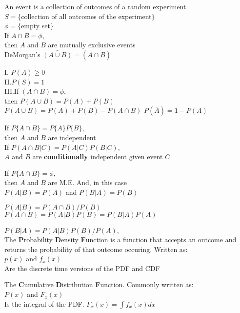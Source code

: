 An event is a collection of outcomes of a random experiment \\
$S=\{$collection of all outcomes of the experiment$\}$ \\
$\phi = \{$empty set$\}$ \\
If $A\cap B=\phi$, \\ then $A$ and $B$ are mutually exclusive events\\
DeMorgan's $\bar{(A\cup B)} = (\bar{A}\cap \bar{B})$

I. $P(A)\geq 0$\\
II.\@ $P(S) = 1$ \\
III.\@ If $(A\cap B) = \phi$, \\then $P(A\cup B) = P(A) + P(B)$
$P(A\cup B)=P(A) + P(B) -P(A\cap B)$
$P(\bar{A})=1-P(A)$


If $P\{A\cap B\} = P\{A\}P\{B\}$, \\then $A$ and $B$ are independent \\
If $P(A\cap B|C)=P(A|C)P(B|C)$, \\
$A$ and $B$ are {\bf conditionally} independent given event $C$ 

If $P\{A\cap B\} = \phi$, \\then $A$ and $B$ are M.E. 
And, in this case \\
$P(A|B)=P(A)$ and $P(B|A)=P(B)$


$P(A|B)=P(A\cap B)/P(B)$
$P(A\cap B) = P(A|B)P(B) = P(B|A)P(A)$

$P(B|A)=P(A|B)P(B)/P(A)$, \\

%

The {\bfseries P}robability {\bfseries D}ensity {\bfseries F}unction is a function that accepts an outcome and 
returns the probability of that outcome occuring. Written as: \\
$p(x)$ and $f_x(x)$\\
Are the discrete time versions of the PDF and CDF

The {\bfseries C}umulative {\bfseries D}istribution {\bfseries F}unction.
Commonly written as: \\
$P(x)$ and $F_x(x)$ \\
Is the integral of the PDF. 
$F_x(x)=\int f_x(x) dx$








    

